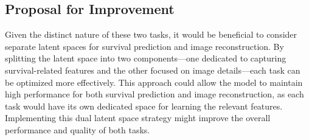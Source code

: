 \documentclass{article}
\begin{document}
\subsection{Proposal for Improvement}

Given the distinct nature of these two tasks, it would be beneficial to consider separate latent spaces for survival prediction and image reconstruction. By splitting the latent space into two components—one dedicated to capturing survival-related features and the other focused on image details—each task can be optimized more effectively. This approach could allow the model to maintain high performance for both survival prediction and image reconstruction, as each task would have its own dedicated space for learning the relevant features. Implementing this dual latent space strategy might improve the overall performance and quality of both tasks.


  

\cleardoublepage
\end{document}
